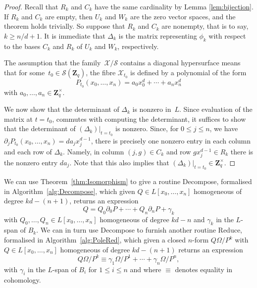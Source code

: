 \documentclass[a4paper,11pt]{article}
\numberwithin{equation}{section}
\newcommand{\ZZ}{\mathbf{Z}} %
\theoremstyle{definition}
\begin{document}
\begin{proof}
Recall that $R_k$ and $C_k$ have the same cardinality by Lemma \ref{lem:bijection}.
If $R_k$ and $C_k$ are empty, then $U_k$ and $W_k$ are the zero vector spaces, 
and the theorem holds trivially. So suppose that $R_k$ and $C_k$ are nonempty, 
that is to say, $k \geq n/d + 1$. It is immediate that $\Delta_k$ is the matrix 
representing $\phi_k$ with respect to the bases $C_k$ and $R_k$ of $U_k$ and $W_k$, 
respectively.

The assumption that the family~$\mathcal{X}/\mathcal{S}$ contains a diagonal 
hypersurface means that for some~$t_0 \in \mathcal{S}(\ZZ_q)$, 
the fibre $\mathcal{X}_{t_0}$ is defined by a polynomial of the form 
\begin{equation*}
P_{t_0}(x_0, \dotsc, x_n) = a_0 x_0^d + \dotsb + a_n x_n^d
\end{equation*}
with $a_0, \dotsc, a_n \in \ZZ_q^{\times}$.

We now show that the determinant of $\Delta_k$ is nonzero in~$L$.  Since 
evaluation of the matrix at 
$t = t_0$, commutes with computing the determinant, it suffices to show that 
the determinant of $(\Delta_k) \big |_{t=t_0}$ is nonzero.  Since, for 
$0 \leq j \leq n$, we have $\partial_j P_{t_0} (x_0, \dotsc, x_n) = d a_j x_j^{d-1}$, 
there is precisely one nonzero entry in each column and each row of $\Delta_k$.  
Namely, in column $(j, g) \in C_k$ and row $g x_j^{d-1} \in R_k$ there is the 
nonzero entry $d a_j$. Note that this also implies that 
$(\Delta_k) \big |_{t=t_0} \in \ZZ_{q}^{\times}$.
\end{proof}

We can use Theorem~\ref{thm:Isomorphism} to give a routine {\sc Decompose}, 
formalised in Algorithm~\ref{alg:Decompose}, which given 
$Q \in L[x_0, \dotsc, x_n]$ homogeneous of degree $kd - (n+1)$, 
returns an expression 
\begin{equation*}
Q = Q_0 \partial_0 P + \dotsb + Q_n \partial_n P + \gamma_k
\end{equation*} 
with $Q_0, \dotsc, Q_n \in L[x_0, \dotsc, x_n]$ homogeneous of 
degree $kd-n$ and $\gamma_k$ in the $L$-span of $B_k$. We can in turn 
use {\sc Decompose} to furnish another routine {\sc Reduce}, formalised 
in Algorithm~\ref{alg:PoleRed}, which given a closed $n$-form $Q\Omega/P^k$ 
with $Q \in L[x_0, \dotsc, x_n]$ homogeneous of degree $kd - (n+1)$ returns 
an expression
\begin{equation*}
Q \Omega / P^k \equiv \gamma_{1} \Omega / P^{1} + \dotsb + \gamma_n \Omega / P^n,
\end{equation*}
with $\gamma_i$ in the $L$-span of $B_i$ for $1 \leq i \leq n$ and 
where $\equiv$ denotes equality in cohomology.
\end{document}
